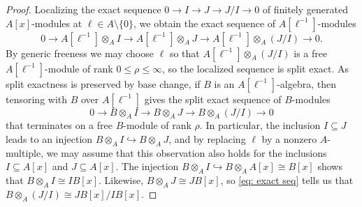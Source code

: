 \documentclass{amsart}
\begin{document}
\begin{proof}
   Localizing the exact sequence $0 \to I \to J \to J/I \to 0$ of finitely generated $A[x]$-modules at $\ell \in A \setminus \{0\}$, we obtain the exact sequence of $A[\ell^{-1}]$-modules
   \[0 \to A[\ell^{-1}] \otimes_A I \to A[\ell^{-1}] \otimes_A J \to A[\ell^{-1}] \otimes_A (J/I) \to 0.\]
   By generic freeness we may choose $\ell$ so that $A[\ell^{-1}] \otimes_A (J/I)$ is a free $A[\ell^{-1}]$-module of rank $0 \leq \rho \leq \infty$, so the localized sequence is split exact.
   As split exactness is preserved by base change, if $B$ is an $A[\ell^{-1}]$-algebra, then tensoring with $B$ over $A[\ell^{-1}]$ gives the split exact sequence of $B$-modules 
   \begin{equation}
      \label{eq: exact seq}
      0 \to B \otimes_A I \to B \otimes_A J \to B \otimes_A (J/I) \to 0
   \end{equation}
   that terminates on a free $B$-module of rank $\rho$.
   In particular, the inclusion $I \subseteq J$ leads to an injection $B\otimes_A I \hookrightarrow B\otimes_A J$, and by replacing $\ell$ by a nonzero $A$-multiple, we may assume that this observation also holds for the inclusions $I\subseteq A[x]$ and $J \subseteq A[x]$.
   The injection $B\otimes_A I \hookrightarrow B\otimes_A A[x] \cong B[x]$ shows that $B \otimes_A I \cong I B[x]$.
   Likewise, $B \otimes_A J \cong JB[x]$, so \eqref{eq: exact seq} tells us that $B \otimes_A (J/I) \cong J B[x]/I B[x]$.
\end{proof}

\end{document}

